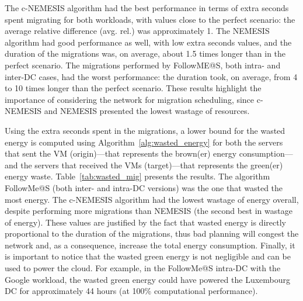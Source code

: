 The c-NEMESIS algorithm had the best performance in terms of extra seconds spent migrating for both workloads, with values close to the perfect scenario: the average relative difference (avg. rel.) was approximately 1. The NEMESIS algorithm had good performance as well, with low extra seconds values, and the duration of the migrations was, on average, about 1.5 times longer than in the perfect scenario. The migrations performed by FollowME@S, both intra- and inter-DC cases, had the worst performance: the duration took, on average, from 4 to 10 times longer than the perfect scenario. These results highlight the importance of considering the network for migration scheduling, since c-NEMESIS and NEMESIS presented the lowest wastage of resources.
                      

Using the extra seconds spent in the migrations, a lower bound for the wasted energy is computed using Algorithm~\ref{alg:wasted_energy} for both the servers that sent the VM (origin)---that represents the brown(er) energy consumption---and the servers that received the VMs (target)---that represents the green(er) energy waste. Table~\ref{tab:wasted_mig} presents the results. The algorithm FollowMe@S (both inter- and intra-DC versions) was the one that wasted the most energy. The c-NEMESIS algorithm had the lowest wastage of energy overall, despite performing more migrations than NEMESIS (the second best in wastage of energy). These values are justified by the fact that wasted energy is directly proportional to the duration of the migrations, thus bad planning will congest the network and, as a consequence, increase the total energy consumption. Finally, it is important to notice that the wasted green energy is not negligible and can be used to power the cloud. For example, in the FollowMe@S intra-DC with the Google workload, the wasted green energy could have powered the Luxembourg DC for approximately 44 hours (at 100\% computational performance).




